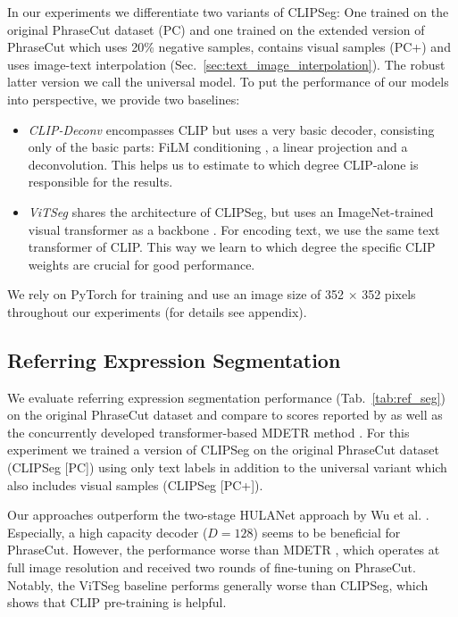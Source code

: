 \documentclass[10pt,twocolumn,letterpaper]{article}
\begin{document}
In our experiments we differentiate two variants of CLIPSeg: One trained on the original PhraseCut dataset (PC) and one trained on the extended version of PhraseCut which uses 20\% negative samples, contains visual samples (PC+) and uses image-text interpolation (Sec.~\ref{sec:text_image_interpolation}). The robust latter version we call the universal model. To put the performance of our models into perspective, we provide two baselines:
\begin{itemize}
\setlength\itemsep{0em}
    \item \emph{CLIP-Deconv} encompasses CLIP but uses a very basic decoder, consisting only of the basic parts: FiLM conditioning \cite{dumoulin18}, a linear projection and a deconvolution. This helps us to estimate to which degree CLIP-alone is responsible for the results.
    \item \emph{ViTSeg} shares the architecture of CLIPSeg, but uses an ImageNet-trained visual transformer as a backbone \cite{timm}. For encoding text, we use the same text transformer of CLIP. This way we learn to which degree the specific CLIP weights are crucial for good performance.
\end{itemize}
We rely on PyTorch \cite{pytorch} for training and use an image size of 352 $\times$ 352 pixels throughout our experiments (for details see appendix).



\subsection{Referring Expression Segmentation}
We evaluate referring expression segmentation performance (Tab.~\ref{tab:ref_seg}) on the original PhraseCut dataset and compare to scores reported by \citet{wu20phrasecut} as well as the concurrently developed transformer-based MDETR method \cite{kamath21}. 
For this experiment we trained a version of CLIPSeg on the original PhraseCut dataset (CLIPSeg [PC]) using only text labels in addition to the universal variant which also includes visual samples (CLIPSeg [PC+]).

Our approaches outperform the two-stage HULANet approach by Wu et al. \cite{wu20phrasecut}. Especially, a high capacity decoder ($D=128$) seems to be beneficial for PhraseCut. However, the performance worse than MDETR \cite{kamath21}, which operates at full image resolution and received two rounds of fine-tuning on PhraseCut. 
Notably, the ViTSeg baseline performs generally worse than CLIPSeg, which shows that CLIP pre-training is helpful.
\end{document}
